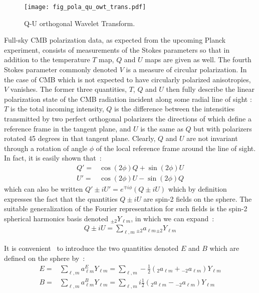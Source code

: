 \begin{figure*}[htb]
\texttt{[image: fig\_pola\_qu\_owt\_trans.pdf]}
\caption{Q-U orthogonal Wavelet Transform.}
\label{fig_qu_owt_trans}
\end{figure*}
Full-sky CMB polarization data, as expected from the upcoming Planck experiment, consists of measurements of the Stokes parameters so that in addition 
to the temperature $T$ map, $Q$ and $U$ maps are given as well. The fourth Stokes parameter commonly denoted $V$ is a measure of circular polarization. 
In the case of CMB which is not expected to have circularly polarized anisotropies, $V$ vanishes. The former three quantities, $T$, $Q$ and $U$ then 
fully describe the linear polarization state of the CMB radiation incident along some radial line of sight : $T$ is the total incoming intensity, $Q$ is 
the difference between the intensities transmitted by two perfect orthogonal polarizers the directions of which define a reference frame in the tangent 
plane, and $U$ is the same as $Q$ but with polarizers rotated 45 degrees in that tangent plane. Clearly, $Q$ and $U$ are not invariant through a rotation 
of angle $\phi$ of the local reference frame around the line of sight. In fact, it is easily shown that~:
\begin{eqnarray}
Q ' = & \cos (2 \phi) Q + \sin(2 \phi) U \\ \nonumber
U ' = & \cos (2 \phi) U - \sin(2 \phi) Q 
\end{eqnarray}
which can also be written $Q' \pm i U' = e^{\mp i\phi} ( Q \pm i U )$ which by definition expresses the fact that the quantities $Q \pm i U$ are 
spin-2 fields on the sphere. The suitable generalization of the Fourier representation for such fields is the spin-2 spherical harmonics basis 
denoted $_{\pm 2}Y_{\ell m}$, in which we can expand~: 
\begin{eqnarray}\label{QU}
Q \pm i U  = \sum_{\ell, m} { _{\pm 2}a_{\ell m}} {_{\pm 2}Y_{\ell m} }
\end{eqnarray}

It is convenient~\cite{zalda} to introduce the two quantities denoted $E$ and $B$ which are defined on the sphere by~:
\begin{eqnarray}\label{EB}
E = & \sum_{\ell, m} a_{\ell m} ^E Y_{\ell m} = \sum_{\ell, m} - \frac{1}{2} ( {_{ 2}a_{\ell m}} + {_{- 2}a_{\ell m}} ) Y_{\ell m} \\ \nonumber
B = & \sum_{\ell, m} a_{\ell m} ^B Y_{\ell m} = \sum_{\ell, m} i \frac{1}{2} ( {_{ 2}a_{\ell m}} - {_{- 2}a_{\ell m}} ) Y_{\ell m} 
\end{eqnarray}

